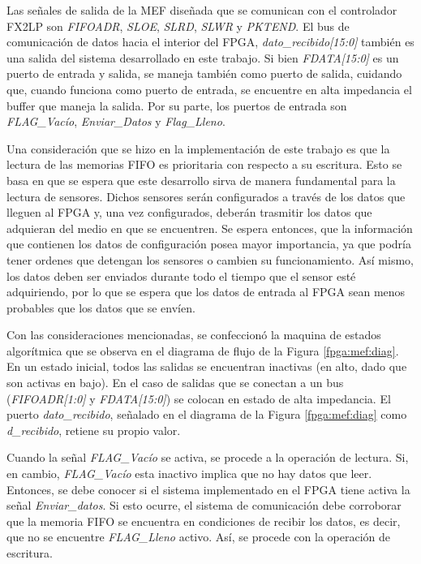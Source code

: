 Las señales de salida de la MEF diseñada que se comunican con el controlador FX2LP son {\it FIFOADR}, {\it SLOE}, {\it SLRD}, {\it SLWR} y {\it  PKTEND}. El bus de comunicación de datos hacia el interior del FPGA, {\it dato\_recibido[15:0]} también es una salida del sistema desarrollado en este trabajo. Si bien {\it FDATA[15:0]} es un puerto de entrada y salida, se maneja también como puerto de salida, cuidando que, cuando funciona como puerto de entrada, se encuentre en alta impedancia el buffer que maneja la salida. Por su parte, los puertos de entrada son {\it FLAG\_Vacío}, {\it Enviar\_Datos} y {\it Flag\_Lleno}.

Una consideración que se hizo en la implementación de este trabajo es que la lectura de las memorias FIFO es prioritaria con respecto a su escritura. Esto se basa en que se espera que este desarrollo sirva de manera fundamental para la lectura de sensores. Dichos sensores serán configurados a través de los datos que lleguen al FPGA y, una vez configurados, deberán trasmitir los datos que adquieran del medio en que se encuentren. Se espera entonces, que la información que contienen los datos de configuración posea mayor importancia, ya que podría tener ordenes que detengan los sensores o cambien su funcionamiento. Así mismo, los datos deben ser enviados durante todo el tiempo que el sensor esté adquiriendo, por lo que se espera que los datos de entrada al FPGA sean menos probables que los datos que se envíen.

Con las consideraciones mencionadas, se confeccionó la maquina de estados algorítmica que se observa en el diagrama de flujo de la Figura \ref{fpga:mef:diag}. En un estado inicial, todos las salidas se encuentran inactivas (en alto, dado que son activas en bajo). En el caso de salidas que se conectan a un bus ({\it FIFOADR[1:0]} y {\it FDATA[15:0]}) se colocan en estado de alta impedancia. El puerto {\it dato\_recibido}, señalado en el diagrama de la Figura \ref{fpga:mef:diag} como {\it d\_recibido}, retiene su propio valor.

Cuando la señal {\it FLAG\_Vacío} se activa, se procede a la operación de lectura. Si, en cambio, {\it FLAG\_Vacío} esta inactivo implica que no hay datos que leer. Entonces, se debe conocer si el sistema implementado en el FPGA tiene activa la señal {\it Enviar\_datos}. Si esto ocurre, el sistema de comunicación debe corroborar que la memoria FIFO se encuentra en condiciones de recibir los datos, es decir, que no se encuentre {\it FLAG\_Lleno} activo. Así, se procede con la operación de escritura.

